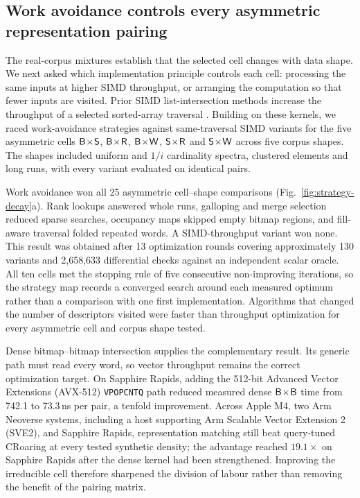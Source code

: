 
\subsection*{Work avoidance controls every asymmetric representation pairing}
\label{sec:r4}

The real-corpus mixtures establish that the selected cell changes with data shape. We next asked
which implementation principle controls each cell: processing the same inputs at higher SIMD
throughput, or arranging the computation so that fewer inputs are visited. Prior SIMD
list-intersection methods increase the throughput of a selected sorted-array traversal
\cite{inoue2014simdintersection,lemire2016simdintersection}. Building on these kernels, we raced
work-avoidance strategies against same-traversal SIMD variants for the five asymmetric cells
$\textsf{B}\!\times\!\textsf{S}$, $\textsf{B}\!\times\!\textsf{R}$, $\textsf{B}\!\times\!\textsf{W}$, $\textsf{S}\!\times\!\textsf{R}$ and
$\textsf{S}\!\times\!\textsf{W}$ across five corpus shapes. The shapes included uniform and $1/i$ cardinality
spectra, clustered elements and long runs, with every variant evaluated on identical pairs.

Work avoidance won all 25 asymmetric cell--shape comparisons (Fig.~\ref{fig:strategy-decay}a). Rank
lookups answered whole runs, galloping and merge selection reduced sparse searches, occupancy maps
skipped empty bitmap regions, and fill-aware traversal folded repeated words. A SIMD-throughput
variant won none. This result was obtained after 13 optimization rounds covering approximately 130
variants and 2,658,633 differential checks against an independent scalar oracle. All ten cells met
the stopping rule of five consecutive non-improving iterations, so the strategy map records a
converged search around each measured optimum rather than a comparison with one first implementation.
Algorithms that changed the number of descriptors visited were faster than throughput optimization
for every asymmetric cell and corpus shape tested.

Dense bitmap--bitmap intersection supplies the complementary result. Its generic path must read every
word, so vector throughput remains the correct optimization target. On Sapphire Rapids, adding the
512-bit Advanced Vector Extensions (AVX-512) \texttt{VPOPCNTQ} path \cite{intel-intrinsics-guide} reduced measured dense
$\textsf{B}\!\times\!\textsf{B}$ time from 742.1 to 73.3\,ns per pair,
a tenfold improvement. Across Apple M4, two Arm Neoverse systems, including a host supporting Arm
Scalable Vector Extension 2 (SVE2), and Sapphire Rapids, representation
matching still beat query-tuned CRoaring at every tested synthetic density; the advantage reached
$19.1\times$ on Sapphire Rapids after the dense kernel had been strengthened. Improving the
irreducible cell therefore sharpened the division of labour rather than removing the benefit of the
pairing matrix.

